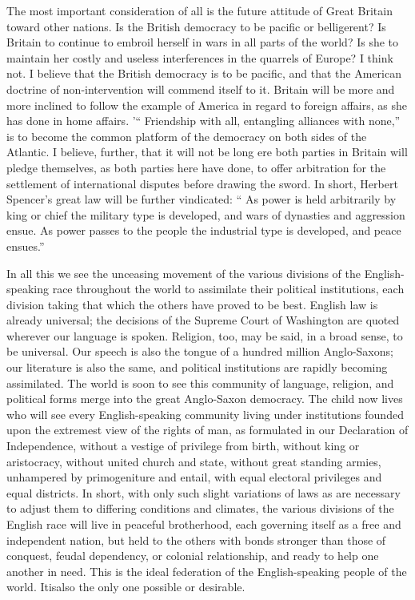 \documentclass[11pt,openany]{book}
\begin{document}
The most important consideration of all is the future attitude of Great Britain toward other nations. Is the British democracy to be pacific or belligerent? Is Britain to continue to embroil herself in wars in all parts of the world? Is she to maintain her costly and useless interferences in the quarrels of Europe? I think not. I believe that the British democracy is to be pacific, and that the American doctrine of non-intervention will commend itself to it. Britain will be more and more inclined to follow the example of America in regard to foreign affairs, as she has done in home affairs. '`` Friendship with all, entangling alliances with none,'' is to become the common platform of the democracy on both sides of the Atlantic. I believe, further, that it will not be long ere both parties in Britain will pledge themselves, as both parties here have done, to offer arbitration for the settlement of international disputes before drawing the sword. In short, Herbert Spencer's great law will be further vindicated: `` As power is held arbitrarily by king or chief the military type is developed, and wars of dynasties and aggression ensue. As power passes to the people the industrial type is developed, and peace ensues.''

In all this we see the unceasing movement of the various divisions of the English-speaking race throughout the world to assimilate their political institutions, each division taking that which the others have proved to be best. English law is already universal; the decisions of the Supreme Court of Washington are quoted wherever our language is spoken. Religion, too, may be said, in a broad sense, to be universal. Our speech is also the tongue of a hundred million Anglo-Saxons; our literature is also the same, and political institutions are rapidly becoming assimilated. The world is soon to see this community of language, religion, and political forms merge into the great Anglo-Saxon democracy. The child now lives who will see every English-speaking community living under institutions founded upon the extremest view of the rights of man, as formulated in our Declaration of Independence, without a vestige of privilege from birth, without king or aristocracy, without united church and state, without great standing armies, unhampered by primogeniture and entail, with equal electoral privileges and equal districts. In short, with only such slight variations of laws as are necessary to adjust them to differing conditions and climates, the various divisions of the English race will live in peaceful brotherhood, each governing itself as a free and independent nation, but held to the others with bonds stronger than those of conquest, feudal dependency, or colonial relationship, and ready to help one another in need. This is the ideal federation of the English-speaking people of the world. Itisalso the only one possible or desirable.
\end{document}

